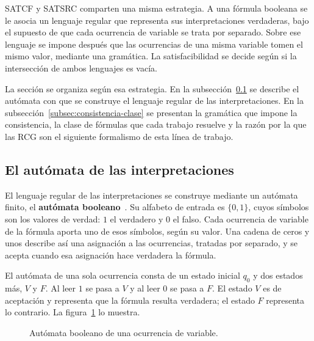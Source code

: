 \documentclass{report}
\theoremstyle{definition}
\theoremstyle{plain}
\theoremstyle{remark}
\begin{document}
SATCF y SATSRC comparten una misma estrategia. A una fórmula booleana se
le asocia un lenguaje regular que representa sus interpretaciones
verdaderas, bajo el supuesto de que cada ocurrencia de variable se trata
por separado. Sobre ese lenguaje se impone después que las ocurrencias
de una misma variable tomen el mismo valor, mediante una gramática. La
satisfacibilidad se decide según si la intersección de ambos lenguajes
es vacía.

La sección se organiza según esa estrategia. En la
subsección~\ref{subsec:automata-interpretaciones} se describe el
autómata con que se construye el lenguaje regular de las
interpretaciones. En la subsección~\ref{subsec:consistencia-clase} se
presentan la gramática que impone la consistencia, la clase de fórmulas
que cada trabajo resuelve y la razón por la que las RCG son el
siguiente formalismo de esta línea de trabajo.

\subsection{El autómata de las interpretaciones}
\label{subsec:automata-interpretaciones}

El lenguaje regular de las interpretaciones se construye mediante un
autómata finito, el \textbf{autómata
booleano}~\cite{fernandezarias2007}. Su alfabeto de entrada es
$\{0,1\}$, cuyos símbolos son los valores de verdad: $1$ el verdadero y
$0$ el falso. Cada ocurrencia de variable de la fórmula aporta uno de
esos símbolos, según su valor. Una cadena de ceros y unos describe así
una asignación a las ocurrencias, tratadas por separado, y se acepta
cuando esa asignación hace verdadera la fórmula.

El autómata de una sola ocurrencia consta de un estado inicial $q_0$ y
dos estados más, $V$ y $F$. Al leer $1$ se pasa a $V$ y al leer $0$ se
pasa a $F$. El estado $V$ es de aceptación y representa que la fórmula
resulta verdadera; el estado $F$ representa lo contrario. La
figura~\ref{fig:automata-base} lo muestra.

\begin{figure}[ht]
\centering
{}
\caption{Autómata booleano de una ocurrencia de variable.}
\label{fig:automata-base}
\end{figure}
\end{document}
